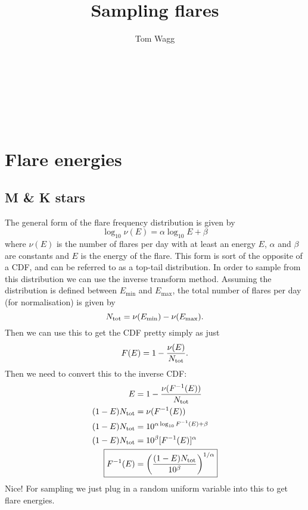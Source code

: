 \documentclass[10pt]{article}
\title{Sampling flares}
\author{Tom Wagg}
\newcommand{\DocTitle}{
    \begin{center}
        {\noindent\Large\bf  \\[0.5\baselineskip] {\fontfamily{cmr}\selectfont \thetitle}}\\
        \hfill{\noindent\Large\bf  \\}\hfill\\[0.5\baselineskip]
    \end{center}
}
\begin{document}
\thispagestyle{empty}

\DocTitle{}

\section{Flare energies}
\subsection{M \& K stars}

The general form of the flare frequency distribution is given by
\begin{equation}
    \log_{10} \nu(E) = \alpha \log_{10} E + \beta
\end{equation}
where $\nu(E)$ is the number of flares per day with at least an energy $E$, $\alpha$ and $\beta$ are constants and $E$ is the energy of the flare. This form is sort of the opposite of a CDF, and can be referred to as a top-tail distribution. In order to sample from this distribution we can use the inverse transform method. Assuming the distribution is defined between $E_{\text{min}}$ and $E_{\text{max}}$, the total number of flares per day (for normalisation) is given by
\begin{equation}
    N_{\rm tot} = \nu(E_{\rm min}) - \nu(E_{\rm max}).
\end{equation}
Then we can use this to get the CDF pretty simply as just
\begin{equation}
    F(E) = 1 - \frac{\nu(E)}{N_{\rm tot}}.
\end{equation}
Then we need to convert this to the inverse CDF:
\begin{align}
    E &= 1 - \frac{\nu(F^{-1}(E))}{N_{\rm tot}} \\
    (1 - E) N_{\rm tot} &= \nu(F^{-1}(E)) \\
    (1 - E) N_{\rm tot} &= 10^{\alpha \log_{10} F^{-1}(E) + \beta} \\
    (1 - E) N_{\rm tot} &= 10^{\beta} [F^{-1}(E)]^\alpha \\
    \Aboxed{ F^{-1}(E) &= \qty(\frac{(1 - E) N_{\rm tot}}{10^{\beta}})^{1/\alpha} }
\end{align}
Nice! For sampling we just plug in a random uniform variable into this to get flare energies.
\end{document}
